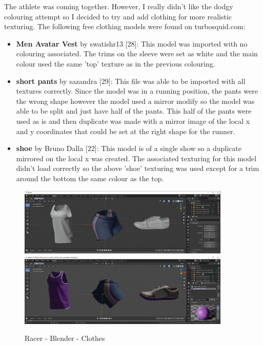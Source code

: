 \documentclass[a4 paper, 12pt]{article}
\begin{document}
The athlete was coming together. However, I really didn't like the dodgy colouring attempt so I decided to try and add clothing for more realistic texturing. The following free clothing models were found on turbosquid.com:
\begin{itemize}
    \item \textbf{Men Avatar Vest} by swatishr13 [28]: This model was imported with no colouring associated. The trims on the sleeve were set as white and the main colour used the same 'top' texture as in the previous colouring. 
    \item \textbf{short pants} by sazandra [29]: This file was able to be imported with all textures correctly. Since the model was in a running position, the pants were the wrong shape however the model used a mirror modify so the model was able to be split and just have half of the pants. This half of the pants were used as is and then duplicate was made with a mirror image of the local x and y coordinates that could be set at the right shape for the runner.
    \item \textbf{shoe} by Bruno Dalla [22]: This model is of a single show so a duplicate mirrored on the local x was created. The associated texturing for this model didn't load correctly so the above 'shoe' texturing was used except for a trim around the bottom the same colour as the top.
\end{itemize}


\begin{figure} [H]
    \centering
    \includegraphics[width=0.9\textwidth, frame]
        {./images/olympics/athlete_clothes_base.PNG}
    \includegraphics[width=0.9\textwidth, frame]
        {./images/olympics/athlete_clothes_colour.PNG}    
    \caption{Racer - Blender - Clothes}   
\end{figure}
\end{document}
